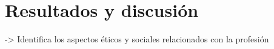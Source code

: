 
\chapter{Resultados y discusión}
\label{cha:ResultadosyDiscusion}

    -> Identifica los aspectos éticos y sociales relacionados con la profesión

